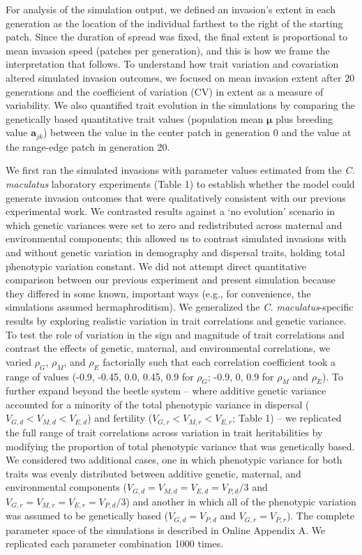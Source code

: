 \documentclass[11pt]{article}
\begin{document}
For analysis of the simulation output, we defined an invasion's extent in each generation as the location of the individual farthest to the right of the starting patch.
Since the duration of spread was fixed, the final extent is proportional to mean invasion speed (patches per generation), and this is how we frame the interpretation that follows.
To understand how trait variation and covariation altered simulated invasion outcomes, we focused on mean invasion extent after 20 generations and the coefficient of variation (CV) in extent as a measure of variability.
We also quantified trait evolution in the simulations by comparing the genetically based quantitative trait values (population mean $\bm{\mu}$ plus breeding value $\bm{a}_{jk}$) between the value in the center patch in generation 0 and the value at the range-edge patch in generation 20.

We first ran the simulated invasions with parameter values estimated from the \textit{C. maculatus} laboratory experiments (Table 1) to establish whether the model could generate invasion outcomes that were qualitatively consistent with our previous experimental work. 
We contrasted results against a `no evolution' scenario in which genetic variances were set to zero and redistributed across maternal and environmental components; this allowed us to contrast simulated invasions with and without genetic variation in demography and dispersal traits, holding total phenotypic variation constant.
We did not attempt direct quantitative comparison between our previous experiment and present simulation because they differed in some known, important ways (e.g., for convenience, the simulations assumed hermaphroditism). 
We generalized the \textit{C. maculatus}-specific results by exploring realistic variation in trait correlations and genetic variance. 
To test the role of variation in the sign and magnitude of trait correlations and contrast the effects of genetic, maternal, and environmental correlations, we varied $\rho_{G}$, $\rho_{M}$, and $\rho_{E}$ factorially such that each correlation coefficient took a range of values (-0.9, -0.45, 0.0, 0.45, 0.9 for $\rho_{G}$; -0.9, 0, 0.9 for $\rho_{M}$ and $\rho_{E}$).
To further expand beyond the beetle system -- where additive genetic variance accounted for a minority of the total phenotypic variance in dispersal ($V_{G,d} < V_{M,d} < V_{E,d}$) and fertility ($V_{G,r} < V_{M,r} < V_{E,r}$; Table 1) -- we replicated the full range of trait correlations across variation in trait heritabilities by modifying the proportion of total phenotypic variance that was genetically based.
We considered two additional cases, one in which phenotypic variance for both traits was evenly distributed between additive genetic, maternal, and environmental components ($V_{G,d} = V_{M,d} = V_{E,d} = V_{P,d}/3$ and $V_{G,r} = V_{M,r} = V_{E,r} = V_{P,d}/3$) and another in which all of the phenotypic variation was assumed to be genetically based ($V_{G,d} = V_{P,d}$ and $V_{G,r} = V_{P,r}$). 
The complete parameter space of the simulations is described in Online Appendix A.
We replicated each parameter combination 1000 times.
\end{document}
